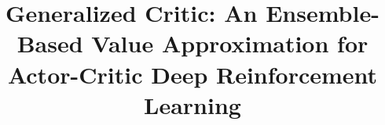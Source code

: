 \documentclass[review]{elsarticle}
\begin{document}
\begin{frontmatter}

\title{Generalized Critic: An Ensemble-Based Value Approximation for Actor-Critic Deep Reinforcement Learning}







\end{frontmatter}



%










\end{document}
